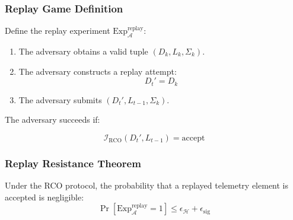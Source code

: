 \subsubsection{Replay Game Definition}

Define the replay experiment $\text{Exp}_{\mathcal{A}}^{\text{replay}}$:

\begin{enumerate}
\item The adversary obtains a valid tuple $(D_k, L_k, \Sigma_k)$.
\item The adversary constructs a replay attempt:
\begin{equation}
D_t' = D_k
\end{equation}
\item The adversary submits $(D_t', L_{t-1}, \Sigma_k)$.
\end{enumerate}

The adversary succeeds if:

\begin{equation}
\mathcal{I}_{\text{RCO}}(D_t', L_{t-1}) = \text{accept}
\end{equation}

\subsubsection{Replay Resistance Theorem}

\begin{theorem}
Under the RCO protocol, the probability that a replayed telemetry element is accepted is negligible:
\[
\Pr[\text{Exp}_{\mathcal{A}}^{\text{replay}} = 1] \leq \epsilon_{\mathcal{H}} + \epsilon_{\text{sig}}
\]
\end{theorem}

